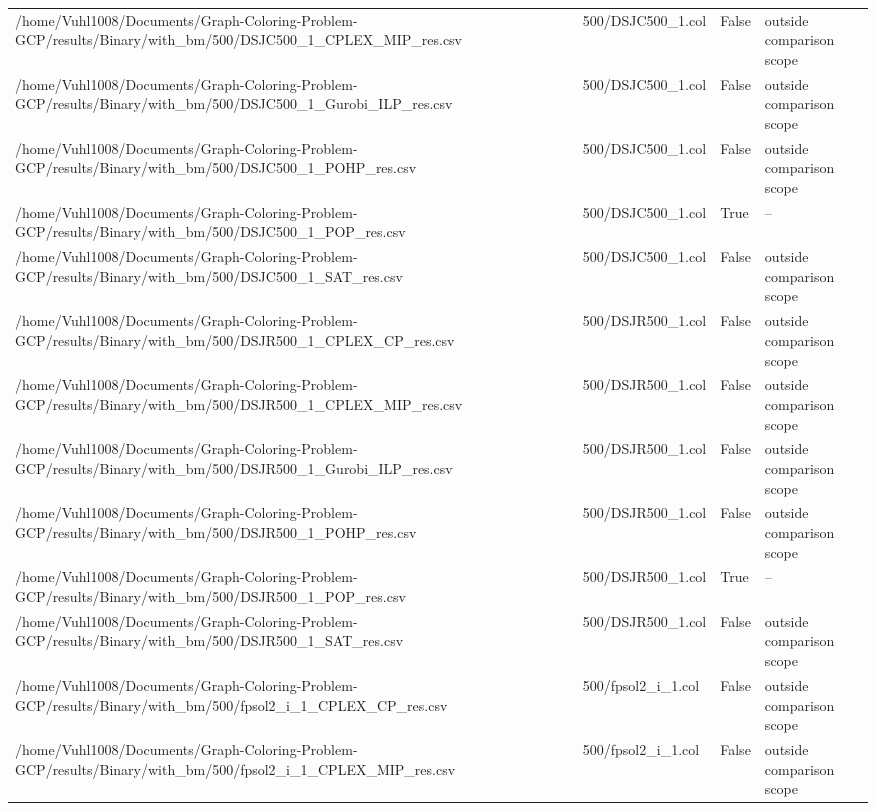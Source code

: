 \begin{table}[htbp]
\begin{tabular}{llll}
/home/Vuhl1008/Documents/Graph-Coloring-Problem-GCP/results/Binary/with\_bm/500/DSJC500\_1\_CPLEX\_MIP\_res.csv & 500/DSJC500\_1.col & False & outside comparison scope \\
/home/Vuhl1008/Documents/Graph-Coloring-Problem-GCP/results/Binary/with\_bm/500/DSJC500\_1\_Gurobi\_ILP\_res.csv & 500/DSJC500\_1.col & False & outside comparison scope \\
/home/Vuhl1008/Documents/Graph-Coloring-Problem-GCP/results/Binary/with\_bm/500/DSJC500\_1\_POHP\_res.csv & 500/DSJC500\_1.col & False & outside comparison scope \\
/home/Vuhl1008/Documents/Graph-Coloring-Problem-GCP/results/Binary/with\_bm/500/DSJC500\_1\_POP\_res.csv & 500/DSJC500\_1.col & True & -- \\
/home/Vuhl1008/Documents/Graph-Coloring-Problem-GCP/results/Binary/with\_bm/500/DSJC500\_1\_SAT\_res.csv & 500/DSJC500\_1.col & False & outside comparison scope \\
/home/Vuhl1008/Documents/Graph-Coloring-Problem-GCP/results/Binary/with\_bm/500/DSJR500\_1\_CPLEX\_CP\_res.csv & 500/DSJR500\_1.col & False & outside comparison scope \\
/home/Vuhl1008/Documents/Graph-Coloring-Problem-GCP/results/Binary/with\_bm/500/DSJR500\_1\_CPLEX\_MIP\_res.csv & 500/DSJR500\_1.col & False & outside comparison scope \\
/home/Vuhl1008/Documents/Graph-Coloring-Problem-GCP/results/Binary/with\_bm/500/DSJR500\_1\_Gurobi\_ILP\_res.csv & 500/DSJR500\_1.col & False & outside comparison scope \\
/home/Vuhl1008/Documents/Graph-Coloring-Problem-GCP/results/Binary/with\_bm/500/DSJR500\_1\_POHP\_res.csv & 500/DSJR500\_1.col & False & outside comparison scope \\
/home/Vuhl1008/Documents/Graph-Coloring-Problem-GCP/results/Binary/with\_bm/500/DSJR500\_1\_POP\_res.csv & 500/DSJR500\_1.col & True & -- \\
/home/Vuhl1008/Documents/Graph-Coloring-Problem-GCP/results/Binary/with\_bm/500/DSJR500\_1\_SAT\_res.csv & 500/DSJR500\_1.col & False & outside comparison scope \\
/home/Vuhl1008/Documents/Graph-Coloring-Problem-GCP/results/Binary/with\_bm/500/fpsol2\_i\_1\_CPLEX\_CP\_res.csv & 500/fpsol2\_i\_1.col & False & outside comparison scope \\
/home/Vuhl1008/Documents/Graph-Coloring-Problem-GCP/results/Binary/with\_bm/500/fpsol2\_i\_1\_CPLEX\_MIP\_res.csv & 500/fpsol2\_i\_1.col & False & outside comparison scope \\

\end{tabular}
\end{table}
